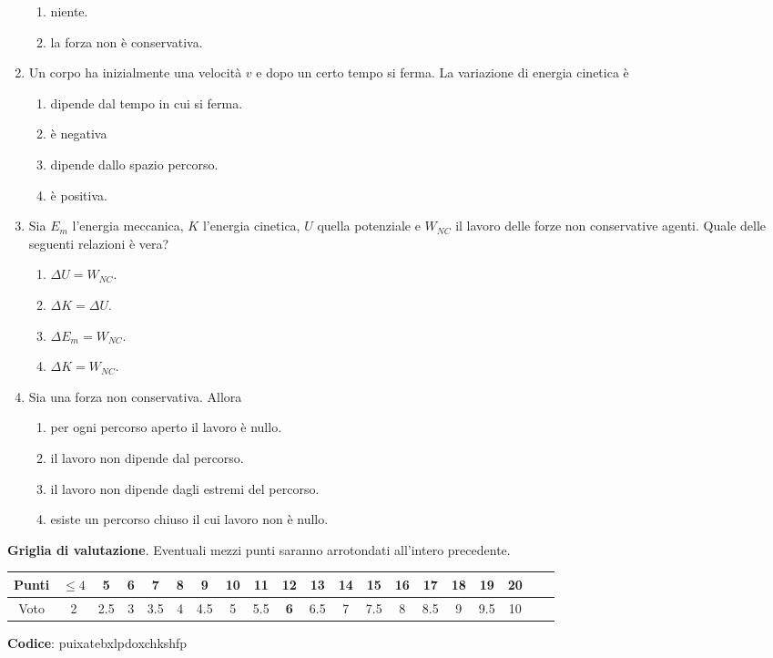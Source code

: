 \documentclass{article}
\begin{document}
\begin{enumerate}
\begin{enumerate}[label=\Alph*.]
    \item niente.
    \item la forza non è conservativa.
  \end{enumerate}
  \item Un corpo ha inizialmente una velocità $v$ e dopo un certo tempo si ferma. La variazione di energia cinetica è
  \begin{enumerate}[label=\Alph*.]
    \item dipende dal tempo in cui si ferma.
    \item è negativa
    \item dipende dallo spazio percorso.
    \item è positiva.
  \end{enumerate}
  \item Sia $E_m$ l'energia meccanica, $K$ l'energia cinetica, $U$ quella potenziale e $W_{NC}$ il lavoro delle forze non conservative agenti. Quale delle seguenti relazioni è vera?
  \begin{enumerate}[label=\Alph*.]
    \item $\Delta U=W_{NC}$.
    \item $\Delta K = \Delta U$.
    \item $\Delta E_m=W_{NC}$.
    \item $\Delta K=W_{NC}.$
  \end{enumerate}
  \item Sia  una forza non conservativa. Allora
  \begin{enumerate}[label=\Alph*.]
    \item per ogni percorso aperto il lavoro è nullo.
    \item il lavoro non dipende dal percorso.
    \item il lavoro non dipende dagli estremi del percorso.
    \item esiste un percorso chiuso il cui lavoro non è nullo.
  \end{enumerate}
\end{enumerate}








\newpage \maketitle \centering \textbf{Griglia di valutazione}. Eventuali mezzi punti saranno arrotondati all'intero precedente. \begin{table}[h]     \centering \begin{tabular}{|c|c|c|c|c|c|c|c|c|c|c|c|c|c|c|c|c|c|c|c|} \hline Punti &  $\leq 4$ & 5 & 6 & 7 & 8 & 9 & 10 & 11 & \textbf{12} & 13 & 14 & 15 & 16 & 17 & 18 & 19 & 20 \\ \hline Voto & 2 & 2.5 & 3 & 3.5 & 4 & 4.5 & 5 & 5.5 & \textbf{6} & 6.5 & 7 & 7.5 & 8 & 8.5 & 9 & 9.5 & 10 \\ \hline \end{tabular} \end{table}
\textbf{Codice}: puixatebxlpdoxchkshfp
\end{document}
